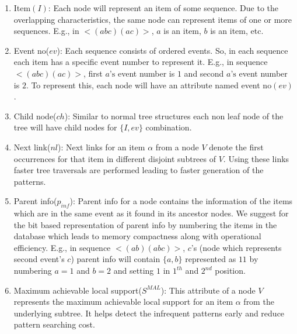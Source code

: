         \begin{enumerate}
           \item Item$(I)$: Each node will represent an item of some sequence. Due to the overlapping characteristics, the same node can represent items of one or more sequences. E.g., in $< (abc)(ac) >$, $a$ is an item, $b$ is an item, etc.
           \item Event no($ev$): Each sequence consists of ordered events. So, in each sequence each item has a specific event number to represent it. E.g., in sequence $<(abc)(ac)>$, first $a\text{'s}$ event number is $1$ and second $a\text{'s}$ event number is $2$. To represent this, each node will have an attribute named event no$(ev)$.
            \item Child node($ch$): Similar to normal tree structures each non leaf node of the tree will have child nodes for $\{I,ev\}$ combination.
            \item Next link($nl$): Next links for an item $\alpha$ from a node $V$ denote the first occurrences for that item in different disjoint subtrees of $V$. Using these links faster tree traversals are performed leading to faster generation of the patterns.
            \item Parent info($p_{inf}$): Parent info for a node contains the information of the items which are in the same event as it found in its ancestor nodes. We suggest for the bit based representation of parent info by numbering the items in the database which leads to memory compactness along with operational efficiency. E.g., in sequence $<(ab)(abc)>$, $c$'s (node which represents second event's $c$) parent info will contain $\{a,b\}$ represented as $11$ by numbering $a=1$ and $b=2$ and setting $1$ in $1^{th}$ and $2^{nd}$ position.
            \item  Maximum achievable local support($S^{MAL}$): This attribute of a node $V$ represents the maximum achievable local support for an item $\alpha$ from the underlying subtree. It helps detect the infrequent patterns early and reduce pattern searching cost.



\end{enumerate}
